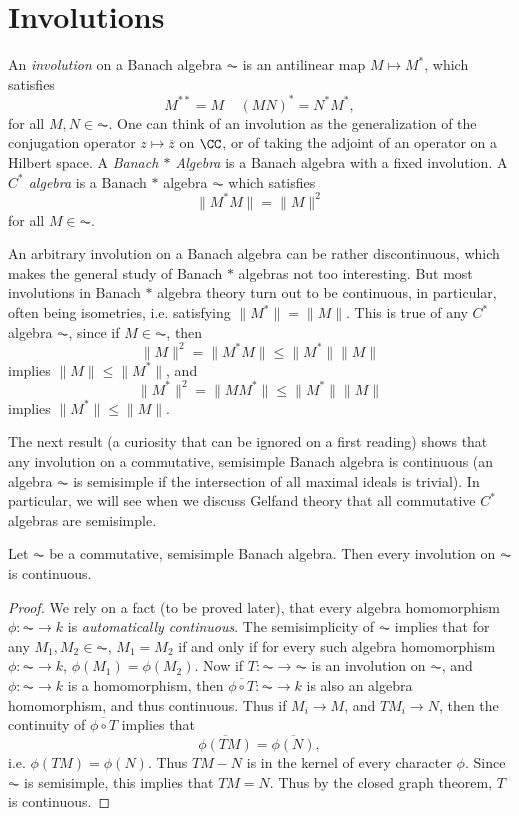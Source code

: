 \section{Involutions}

An \emph{involution} on a Banach algebra $\AC$ is an antilinear map $M \mapsto M^*$, which satisfies
%
\[ M^{**} = M\ \ \ \ \ (MN)^* = N^*M^*, \]
%
for all $M,N \in \AC$. One can think of an involution as the generalization of the conjugation operator $z \mapsto \overline{z}$ on $\CC$, or of taking the adjoint of an operator on a Hilbert space. A \emph{Banach $*$ Algebra} is a Banach algebra with a fixed involution. A \emph{$C^*$ algebra} is a Banach $*$ algebra $\AC$ which satisfies
%
\[ \| M^* M \| = \| M \|^2 \]
%
for all $M \in \AC$.

An arbitrary involution on a Banach algebra can be rather discontinuous, which makes the general study of Banach $*$ algebras not too interesting. But most involutions in Banach $*$ algebra theory turn out to be continuous, in particular, often being isometries, i.e. satisfying $\| M^* \| = \| M \|$. This is true of any $C^*$ algebra $\AC$, since if $M \in \AC$, then
%
\[ \| M \|^2 = \| M^* M \| \leq \| M^* \| \| M \| \]
%
implies $\| M \| \leq \| M^* \|$, and
%
\[ \| M^* \|^2 = \| M M^* \| \leq \| M^* \| \| M \| \]
%
implies $\| M^* \| \leq \| M \|$.

The next result (a curiosity that can be ignored on a first reading) shows that any involution on a commutative, semisimple Banach algebra is continuous (an algebra $\AC$ is semisimple if the intersection of all maximal ideals is trivial). In particular, we will see when we discuss Gelfand theory that all commutative $C^*$ algebras are semisimple.

\begin{prop}
    Let $\AC$ be a commutative, semisimple Banach algebra. Then every involution on $\AC$ is continuous.
\end{prop}
\begin{proof}
    We rely on a fact (to be proved later), that every algebra homomorphism $\phi: \AC \to k$ is \emph{automatically continuous}. The semisimplicity of $\AC$ implies that for any $M_1,M_2 \in \AC$, $M_1 = M_2$ if and only if for every such algebra homomorphism $\phi: \AC \to k$, $\phi(M_1) = \phi(M_2)$. Now if $T: \AC \to \AC$ is an involution on $\AC$, and $\phi: \AC \to k$ is a homomorphism, then $\overline{\phi \circ T}: \AC \to k$ is also an algebra homomorphism, and thus continuous. Thus if $M_i \to M$, and $TM_i \to N$, then the continuity of $\overline{\phi \circ T}$ implies that
    \[ \overline{\phi(TM)} = \overline{\phi(N)}, \]
    i.e. $\phi(TM) = \phi(N)$. Thus $TM - N$ is in the kernel of every character $\phi$. Since $\AC$ is semisimple, this implies that $TM = N$. Thus by the closed graph theorem, $T$ is continuous.
\end{proof}

